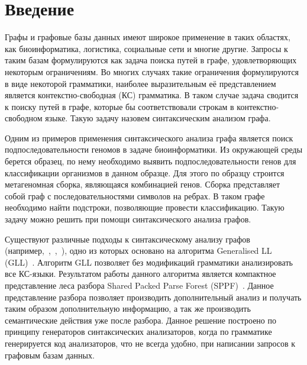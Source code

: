 \section*{Введение}
Графы и графовые базы данных имеют широкое применение в таких областях, как биоинформатика, логистика, социальные сети и многие другие. Запросы к таким базам формулируются как задача поиска путей в графе, удовлетворяющих некоторым ограничениям. Во многих случаях такие ограничения формулируются в виде некоторой грамматики, наиболее выразительным её представлением является контекстно-свободная (КС) грамматика. В таком случае задача сводится к поиску путей в графе, которые бы соответствовали строкам в контекстно-свободном языке. Такую задачу назовем синтаксическим анализом графа. 

Одним из примеров применения синтаксического анализа графа является поиск подпоследовательности геномов в задаче биоинформатики. Из окружающей среды берется образец, по нему необходимо выявить подпоследовательности генов для классификации организмов в данном образце. Для этого по образцу строится метагеномная сборка, являющаяся комбинацией генов. Сборка представляет собой граф с последовательностями символов на ребрах. В таком графе необходимо найти подстроки, позволяющие провести классификацию. Такую задачу можно решить при помощи синтаксического анализа графов.

Существуют различные подходы к синтаксическому анализу графов (например,~\cite{GrigRagCFPQuerying},~\cite{Hellings},~\cite{Sevon}), одно из которых основано на алгоритма Generalised LL (GLL)~\cite{GrigRagCFPQuerying}. Алгоритм GLL позволяет без модификаций грамматики анализировать все КС-языки. Результатом работы данного алгоритма является компактное представление леса разбора Shared Packed Parse Forest (SPPF)~\cite{SPPF}. Данное представление разбора позволяет производить дополнительный анализ и получать таким образом дополнительную информацию, а так же производить семантические действия уже после разбора. Данное решение построено по принципу генераторов синтаксических анализаторов, когда по грамматике генерируется код анализаторов, что не всегда удобно, при написании запросов к графовым базам данных.

